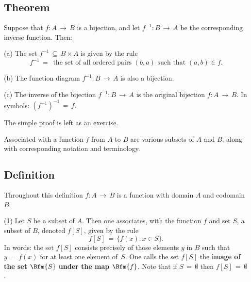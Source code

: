 \VV


        \subsection{\small{\bf Theorem}}
        \label{ThmA30.26B}

\V

        Suppose that $f:A \,{\rightarrow}\, B$ is a bijection, and let $f^{-1}:B \,{\rightarrow}\, A$ be the corresponding inverse function. Then:

\V

        (a) The set $f^{-1} \,{\subseteq}\, B{\times}A$ is given by the rule
        \begin{displaymath}
        f^{-1} \,=\, \mbox{ the set of all ordered pairs $(b,a)$ such that $(a,b){\in}f$}.
        \end{displaymath}

\V

        (b) The function diagram $f^{-1}:B \,{\rightarrow}\, A$ is also a bijection.

\V

        (c) The inverse of the bijection $f^{-1}:B \,{\rightarrow}\, A$ is the original bijection $f:A \,{\rightarrow}\, B$.
    In symbols: $(f^{-1})^{-1} \,=\, f$.

\V

        The simple proof is left as an exercise.



\VV

        Associated with a function $f$ from $A$ to $B$ are various subsets of $A$ and $B$, along with corresponding notation and terminology.

            \subsection{\small{\bf Definition}}
            \label{DefA30.15}

        Throughout this definition $f:A \,{\rightarrow}\, B$ is a function with domain $A$ and codomain~$B$.

\V

        (1) Let $S$ be a subset of $A$. Then one associates, with the function $f$ and set $S$, a subset of $B$, denoted $f[S]$, given by the rule
        \begin{displaymath}
        f[S] \,=\, \{f(x):x{\in}S\}.
        \end{displaymath}
    In words: the set $f[S]$ consists precisely of those elements $y$ in $B$ such that $y \,=\, f(x)$ for at least one element of~$S$.
    One calls the set $f[S]$ the {\bf image of the set $\Bfm{S}$ under the map $\Bfm{f}$}.
    Note that if $S \,=\, {\emptyset}$ then $f[S] \,=\, {\emptyset}$.

